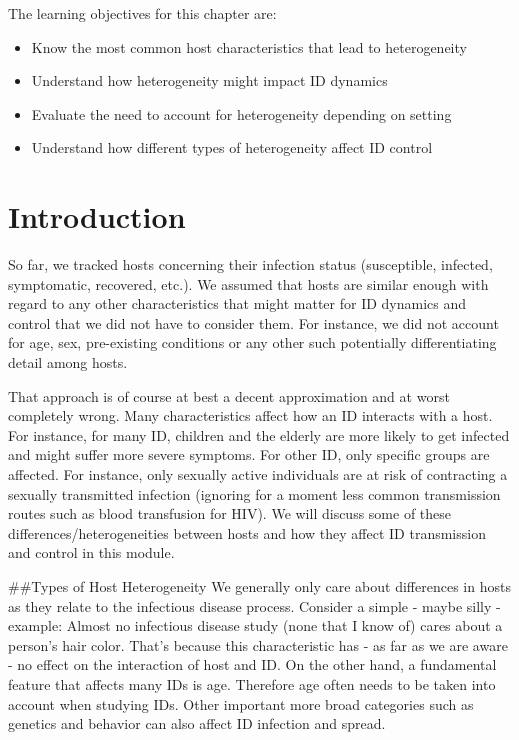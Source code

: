 \documentclass[]{book}
\providecommand{\tightlist}{%
  \setlength{\itemsep}{0pt}\setlength{\parskip}{0pt}}
\theoremstyle{definition}
\theoremstyle{definition}
\theoremstyle{definition}
\theoremstyle{remark}
\begin{document}
The learning objectives for this chapter are:

\begin{itemize}
\tightlist
\item
  Know the most common host characteristics that lead to heterogeneity
\item
  Understand how heterogeneity might impact ID dynamics
\item
  Evaluate the need to account for heterogeneity depending on setting
\item
  Understand how different types of heterogeneity affect ID control
\end{itemize}

\hypertarget{introduction-6}{%
\section{Introduction}\label{introduction-6}}

So far, we tracked hosts concerning their infection status (susceptible,
infected, symptomatic, recovered, etc.). We assumed that hosts are
similar enough with regard to any other characteristics that might
matter for ID dynamics and control that we did not have to consider
them. For instance, we did not account for age, sex, pre-existing
conditions or any other such potentially differentiating detail among
hosts.

That approach is of course at best a decent approximation and at worst
completely wrong. Many characteristics affect how an ID interacts with a
host. For instance, for many ID, children and the elderly are more
likely to get infected and might suffer more severe symptoms. For other
ID, only specific groups are affected. For instance, only sexually
active individuals are at risk of contracting a sexually transmitted
infection (ignoring for a moment less common transmission routes such as
blood transfusion for HIV). We will discuss some of these
differences/heterogeneities between hosts and how they affect ID
transmission and control in this module.

\#\#Types of Host Heterogeneity We generally only care about differences
in hosts as they relate to the infectious disease process. Consider a
simple - maybe silly - example: Almost no infectious disease study (none
that I know of) cares about a person's hair color. That's because this
characteristic has - as far as we are aware - no effect on the
interaction of host and ID. On the other hand, a fundamental feature
that affects many IDs is age. Therefore age often needs to be taken into
account when studying IDs. Other important more broad categories such as
genetics and behavior can also affect ID infection and spread.
\end{document}
